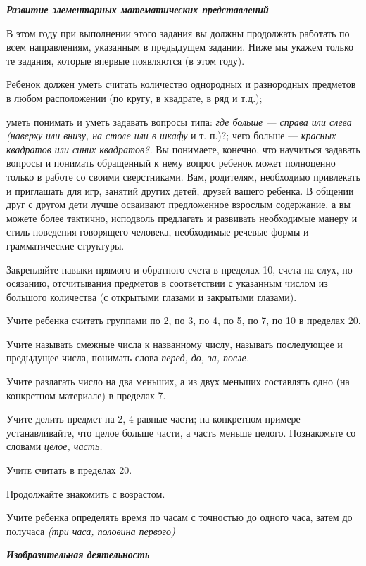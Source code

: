 \documentclass[a5paper]{book}
\renewcommand{\emph}[1]{\textit{#1}}
\begin{document}
\emph{\textbf{Развитие элементарных математических представлений}}

В этом году при выполнении этого задания вы должны продолжать работать
по всем направлениям, указанным в предыдущем задании. Ниже мы укажем
только те задания, которые впервые появляются (в этом году).

Ребенок должен уметь считать количество однородных и разнородных
предметов в любом расположении (по кругу, в квадрате, в ряд и т.д.);

уметь понимать и уметь задавать вопросы типа: \emph{где больше ---
справа или слева (наверху или внизу, на столе или в шкафу} и т. п.)?;
чего больше --- \emph{красных квадратов или синих квадратов?.} Вы
понимаете, конечно, что научиться задавать вопросы и понимать обращенный
к нему вопрос ребенок может полноценно только в работе со своими
сверстниками. Вам, родителям, необходимо привлекать и приглашать для
игр, занятий других детей, друзей вашего ребенка. В общении друг с
другом дети лучше осваивают предложенное взрослым содержание, а вы
можете более тактично, исподволь предлагать и развивать необходимые
манеру и стиль поведения говорящего человека, необходимые речевые формы
и грамматические структуры.

Закрепляйте навыки прямого и обратного счета в пределах 10, счета на
слух, по осязанию, отсчитывания предметов в соответствии с указанным
числом из большого количества (с открытыми глазами и закрытыми глазами).

Учите ребенка считать группами по 2, по 3, по 4, по 5, по 7, по 10 в
пределах 20.

Учите называть смежные числа к названному числу, называть последующее и
предыдущее числа, понимать слова \emph{перед, до, за, после.}

Учите разлагать число на два меньших, а из двух меньших составлять одно
(на конкретном материале) в пределах 7.

Учите делить предмет на 2, 4 равные части; на конкретном примере
устанавливайте, что целое больше части, а часть меньше целого.
Познакомьте со словами \emph{целое, часть.}

\textsc{Учите} считать в пределах 20.

Продолжайте знакомить с возрастом.

Учите ребенка определять время по часам с точностью до одного часа,
затем до получаса \emph{(три часа, половина первого)}

\emph{\textbf{Изобразительная} \textbf{деятельность}}
\end{document}
